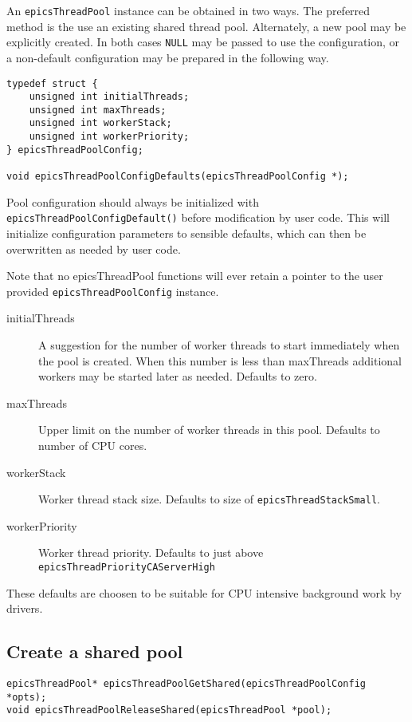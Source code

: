 An \verb|epicsThreadPool| instance can be obtained in two ways. The preferred
method is the use an existing shared thread pool. Alternately, a new
pool may be explicitly created. In both cases \verb|NULL| may be passed to use
the configuration, or a non-default configuration may be prepared in the following way.

\begin{verbatim}
typedef struct {
    unsigned int initialThreads;
    unsigned int maxThreads;
    unsigned int workerStack;
    unsigned int workerPriority;
} epicsThreadPoolConfig;

void epicsThreadPoolConfigDefaults(epicsThreadPoolConfig *);
\end{verbatim}


Pool configuration should always be initialized with \verb|epicsThreadPoolConfigDefault()|
before modification by user code. This will initialize configuration
parameters to sensible defaults, which can then be overwritten as
needed by user code.

Note that no epicsThreadPool functions will ever retain a pointer
to the user provided \verb|epicsThreadPoolConfig| instance.

\begin{description}
\item [{initialThreads}] A suggestion for the number of worker threads to start
immediately when the pool is created. When this number is less than
maxThreads additional workers may be started later as needed. Defaults to zero.
\item [{maxThreads}] Upper limit on the number of worker threads in this
pool. Defaults to number of CPU cores.
\item [{workerStack}] Worker thread stack size. Defaults to size of \verb|epicsThreadStackSmall|.
\item [{workerPriority}] Worker thread priority. Defaults to just above \verb|epicsThreadPriorityCAServerHigh|
\end{description}

These defaults are choosen to be suitable for CPU intensive background work by drivers.

\subsection{Create a shared pool}

\begin{verbatim}
epicsThreadPool* epicsThreadPoolGetShared(epicsThreadPoolConfig *opts);
void epicsThreadPoolReleaseShared(epicsThreadPool *pool);
\end{verbatim}


